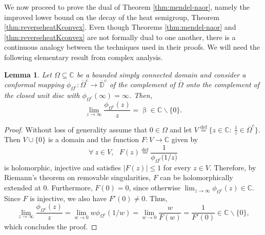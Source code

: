 \documentclass[11pt,reqno]{amsart}
\renewcommand{\leq}{\leqslant}
\renewcommand{\setminus}{\smallsetminus}
\newcommand{\1}{\mathbf 1}
\newtheorem{lemma}[theorem]{Lemma}
\theoremstyle{remark}
\newcommand{\C}{\mathbb C}
\newcommand{\eqdef}{\stackrel{\mathrm{def}}{=}}
\renewcommand{\beta}{\upbeta}
\newcommand{\mb}{\mathbb}
\begin{document}
\medskip

We now proceed to prove the dual of Theorem \ref{thm:mendel-naor}, namely the improved lower bound on the decay of the heat semigroup, Theorem \ref{thm:reverseheatKconvex}. Even though Theorems \ref{thm:mendel-naor} and \ref{thm:reverseheatKconvex} are not formally dual to one another, there is a continuous analogy between the techniques used in their proofs. We will need the following elementary result from complex analysis.

\begin{lemma}
Let $\Omega\subseteq\C$ be a bounded simply connected domain and consider a conformal mapping $\phi_{\Omega^c}:\overline{\Omega}^c\to\overline{\mb{D}}^c$ of the complement of $\overline{\Omega}$ onto the complement of the closed unit disc with $\phi_{\Omega^c}(\infty)=\infty$. Then,
\begin{equation} \label{eq:limitquotient}
\lim_{z\to\infty} \frac{\phi_{\Omega^c}(z)}{z} = \beta \in \mb{C}\setminus\{0\}.
\end{equation}
\end{lemma}

\begin{proof}
Without loss of generality assume that $0\in\Omega$ and let $V \eqdef\big\{z\in\mb{C}: \ \frac{1}{z}\in \overline{\Omega}^c\big\}$. Then $V\cup\{0\}$ is a domain and the function $F:V\to \C$ given by
\begin{equation}
\forall \ z\in V, \ \ \ F(z)\eqdef \frac{1}{\phi_{\Omega^c}\big(1/z\big)}
\end{equation}
is holomorphic, injective and satisfies $|F(z)|\leq 1$ for every $z\in V$. Therefore, by Riemann's theorem on removable singularities, $F$ can be holomorphically extended at 0. Furthermore, $F(0)=0$, since otherwise $\lim_{z\to\infty} \phi_{\Omega^c}(z) \in \mb{C}$. Since $F$ is injective, we also have $F'(0)\neq0$. Thus,
\begin{equation}
\lim_{z\to\infty} \frac{\phi_{\Omega^c}(z)}{z} = \lim_{w\to0} w \phi_{\Omega^c}(1/w) = \lim_{w\to0} \frac{w}{F(w)} = \frac{1}{F'(0)} \in \mb{C}\setminus\{0\},
\end{equation}
which concludes the proof.
\end{proof}
\end{document}
